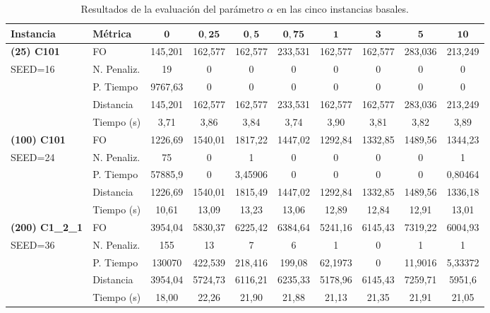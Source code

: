 \documentclass[letter, 10pt, dvipdfmx]{article}
\begin{document}
\vspace{-5mm}
\begin{table}[htbp]
\centering
\caption{Resultados de la evaluación del parámetro $\alpha$ en las cinco instancias basales.}
\label{tab:resultados_alpha}
\footnotesize
\setlength{\tabcolsep}{3pt}
\begin{tabular}{ll cccccccc}
\hline
\textbf{Instancia} & \textbf{Métrica} & $\mathbf{0}$ & $\mathbf{0,25}$ & $\mathbf{0,5}$ & $\mathbf{0,75}$ & $\mathbf{1}$ & $\mathbf{3}$ & $\mathbf{5}$ & $\mathbf{10}$ \\ \hline

\textbf{(25) C101}  & FO & 145,201 & 162,577 & 162,577 & 233,531 & 162,577 & 162,577 & 283,036 & 213,249 \\
SEED=16             & N. Penaliz. & 19      & 0       & 0       & 0       & 0       & 0       & 0       & 0       \\
                    & P. Tiempo   & 9767,63 & 0       & 0       & 0       & 0       & 0       & 0       & 0       \\
                    & Distancia   & 145,201 & 162,577 & 162,577 & 233,531 & 162,577 & 162,577 & 283,036 & 213,249 \\
                    & Tiempo (s)  & 3,71    & 3,86    & 3,84    & 3,74    & 3,90    & 3,81    & 3,82    & 3,89    \\ \hline

\textbf{(100) C101} & FO & 1226,69 & 1540,01 & 1817,22 & 1447,02 & 1292,84 & 1332,85 & 1489,56 & 1344,23 \\
SEED=24             & N. Penaliz. & 75      & 0       & 1       & 0       & 0       & 0       & 0       & 1       \\
                    & P. Tiempo   & 57885,9 & 0       & 3,45906 & 0       & 0       & 0       & 0       & 0,80464 \\
                    & Distancia   & 1226,69 & 1540,01 & 1815,49 & 1447,02 & 1292,84 & 1332,85 & 1489,56 & 1336,18 \\
                    & Tiempo (s)  & 10,61   & 13,09   & 13,23   & 13,06   & 12,89   & 12,84   & 12,91   & 13,01   \\ \hline

\textbf{(200) C1\_2\_1} & FO & 3954,04 & 5830,37 & 6225,42 & 6384,64 & 5241,16 & 6145,43 & 7319,22 & 6004,93 \\
SEED=36             & N. Penaliz. & 155     & 13      & 7       & 6       & 1       & 0       & 1       & 1       \\
                    & P. Tiempo   & 130070  & 422,539 & 218,416 & 199,08  & 62,1973 & 0       & 11,9016 & 5,33372 \\
                    & Distancia   & 3954,04 & 5724,73 & 6116,21 & 6235,33 & 5178,96 & 6145,43 & 7259,71 & 5951,6  \\
                    & Tiempo (s)  & 18,00   & 22,26   & 21,90   & 21,88   & 21,13   & 21,35   & 21,91   & 21,05   \\ \hline


\end{tabular}
\end{table}
\end{document}
